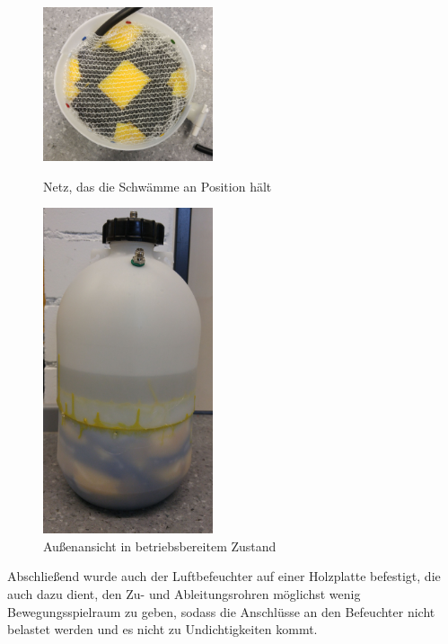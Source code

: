 \begin{figure}[h!]
	\begin{minipage}[hbt]{5cm}
		\centering
		\includegraphics[width=5cm]{Luftbefeuchter_Netz.jpg}
		\caption[Netz Luftbefeuchter]{Netz, das die Schwämme an Position hält}
	\end{minipage}
	\hfill
	\begin{minipage}[hbt]{5cm}
		\centering
		\includegraphics[width=5cm]{Luftbefeuchter_gesamt.jpg}
		\caption[Außenansicht Luftbefeuchter]{Außenansicht in betriebsbereitem Zustand}
	\end{minipage}
\end{figure}

\clearpage

Abschließend wurde auch der Luftbefeuchter auf einer Holzplatte befestigt, die auch dazu dient, den Zu- und Ableitungsrohren möglichst wenig Bewegungsspielraum zu geben, sodass die Anschlüsse an den Befeuchter nicht belastet werden und es nicht zu Undichtigkeiten kommt.



